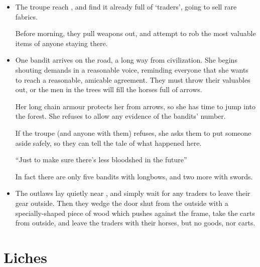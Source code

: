 \begin{multicols}{2}
\showEnc[Hu]

\begin{itemize}
  \item
  The troupe reach , and find it already full of `traders', going to sell rare fabrics.

  Before morning, they pull weapons out, and attempt to rob the most valuable items of anyone staying there.
  \item
  One bandit arrives on the road, a long way from civilization.
  She begins shouting demands in a reasonable voice, reminding everyone that she wants to reach a reasonable, amicable agreement.
  They must throw their valuables out, or the men in the trees will fill the horses full of arrows.

  Her long chain armour protects her from arrows, so she has time to jump into the forest.
  She refuses to allow any evidence of the bandits' number.

  If the troupe (and anyone with them) refuses, she asks them to put someone aside safely, so they can tell the tale of what happened here.

  ``Just to make sure there's less bloodshed in the future''

  In fact there are only five bandits with longbows, and two more with swords.
  \item
  The outlaws lay quietly near , and simply wait for any traders to leave their gear outside.
  Then they wedge the door shut from the outside with a specially-shaped piece of wood which pushes against the frame, take the carts from outside, and leave the traders with their horses, but no goods, nor carts.
\end{itemize}

\end{multicols}

\section[Lich]{Liches}
\label{lich}

